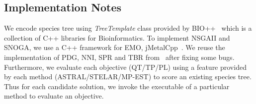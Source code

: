 \subsection{Implementation Notes}
We encode species tree using \textit{TreeTemplate} class provided by BIO++~\cite{gueguen2013bpp} which is a collection of C++ libraries for Bioinformatics. To implement NSGAII and SNOGA, we use a C++ framework for EMO, jMetalCpp~\cite{lopez2013jmetalcpp}. We reuse the implementation of PDG, NNI, SPR and TBR from~\cite{zambrano2016mo} after fixing some bugs. Furthermore, we evaluate each objective (QT/TP/PL) using a feature provided by each method (ASTRAL/STELAR/MP-EST) to score an existing species tree. Thus for each candidate solution, we invoke the executable of a particular method to evaluate an objective.
\begin{comment}
\subsection{Objective Evaluation}
Each method (ASTRAL, STELAR or MP-EST) provides an option to score an existing species tree. We used this feature enable to evaluate the objectives. Thus for each candidate species tree, we invoke the executable of a particular method (ASTRAL/STELAR/MP-EST) to evaluate an objective . %
\end{comment}